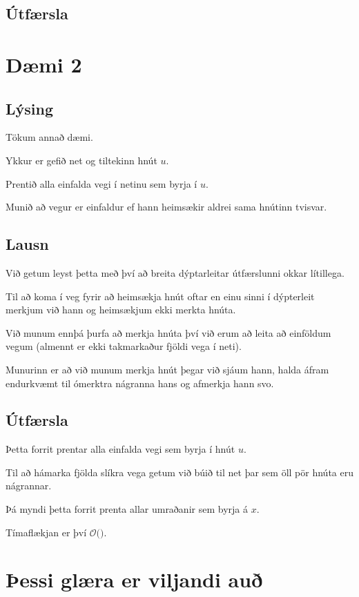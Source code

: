 \subsection{Útfærsla}
{
}

\section{Dæmi 2}
\subsection{Lýsing}
{
	{
		\item<1-> Tökum annað dæmi.
		\item<2-> Ykkur er gefið net og tiltekinn hnút $u$.
		\item<3-> Prentið alla einfalda vegi í netinu sem byrja í $u$.
		\item<4-> Munið að vegur er einfaldur ef hann heimsækir aldrei sama hnútinn tvisvar.
	}
}

\subsection{Lausn}
{
	{
		\item<1-> Við getum leyst þetta með því að breita dýptarleitar útfærslunni okkar lítillega.
		\item<2-> Til að koma í veg fyrir að heimsækja hnút oftar en einu sinni í dýpterleit merkjum við hann og heimsækjum ekki merkta hnúta.
		\item<3-> Við munum ennþá þurfa að merkja hnúta því við erum að leita að einföldum vegum (almennt er ekki takmarkaður fjöldi vega í neti).
		\item<4-> Munurinn er að við munum merkja hnút þegar við sjáum hann, halda áfram endurkvæmt til ómerktra nágranna hans og afmerkja hann svo.
	}
}

\subsection{Útfærsla}
{
	{
		\item<1->[]	
		\item<2-> Þetta forrit prentar alla einfalda vegi sem byrja í hnút $u$.
		\item<3-> Til að hámarka fjölda slíkra vega getum við búið til net þar sem öll pör hnúta eru nágrannar.
		\item<4-> Þá myndi þetta forrit prenta allar umraðanir sem byrja á $x$.
		\item<5-> Tímaflækjan er því $\mathcal{O}($\onslide<6->{$V!$}$)$.
	}
}

\section{Þessi glæra er viljandi auð}
{
}


